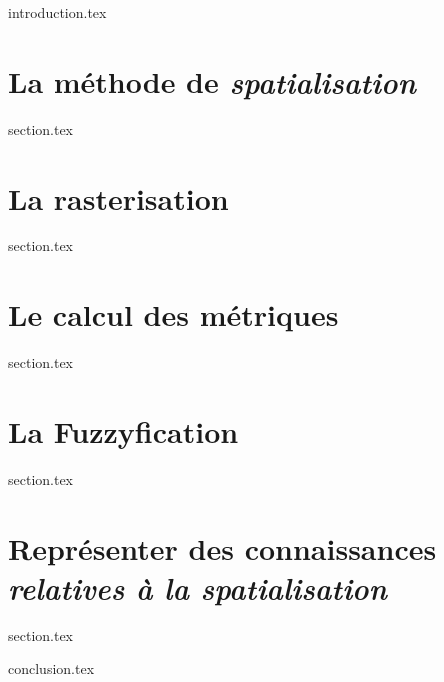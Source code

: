\chaptertoc{}

\label{chap:07-int}
{introduction.tex}

\section{La méthode de \emph{spatialisation}}
\label{chap:07-sec1}
{section.tex}

\section{La rasterisation}
\label{chap:07-sec2}
{section.tex}

\section{Le calcul des métriques}
\label{chap:07-sec3}
{section.tex}

\section{La Fuzzyfication}
\label{chap:07-sec4}
{section.tex}

\section{Représenter des connaissances \emph{relatives à la spatialisation}}
\label{chap:07-sec5}
{section.tex}

\label{chap:07-cnc}
{conclusion.tex}

